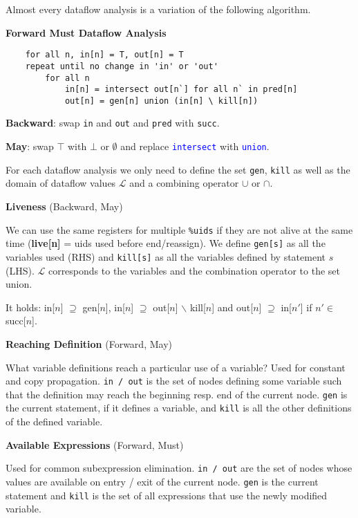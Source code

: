 Almost every dataflow analysis is a variation of the following algorithm.\smallskip

\textbf{Forward Must Dataflow Analysis}
\begin{lstlisting}
	for all n, in[n] = T, out[n] = T
	repeat until no change in 'in' or 'out'
		for all n
			in[n] = intersect out[n`] for all n` in pred[n]
			out[n] = gen[n] union (in[n] \ kill[n])	
\end{lstlisting}
\textbf{Backward}: swap \texttt{in} and \texttt{out} and \texttt{pred} with \texttt{succ}.

\textbf{May}: swap $\top$ with $\bot$ or $\emptyset$ and replace \textcolor{blue}{\texttt{intersect}} with \textcolor{blue}{\texttt{union}}.\medskip

For each dataflow analysis we only need to define the set \texttt{gen}, \texttt{kill} as well as the domain of dataflow values $\mathcal L$ and a combining operator $\cup$ or $\cap$.\medskip

\textbf{Liveness} (Backward, May)\medskip

We can use the same registers for multiple \texttt{\%uids} if they are not alive at the same time
(\textbf{live[n]} = uids used before end/reassign).
We define \texttt{gen[s]} as all the variables used (RHS) and \texttt{kill[s]} as all the variables defined by statement $s$ (LHS). $\mathcal L$ corresponds to the variables and the combination operator to the set union.\medskip

It holds: in[$n$] $\supseteq$ gen[$n$], in[$n$] $\supseteq$ out[$n$] $\backslash$ kill[$n$] and out[$n$] $\supseteq$ in[$n'$] if $n' \in $ succ[$n$].\medskip

\textbf{Reaching Definition} (Forward, May)\medskip

What variable definitions reach a particular use of a variable? Used for constant and copy propagation. \texttt{in / out} is the set of nodes defining some variable such that the definition may reach the beginning resp. end of the current node. \texttt{gen} is the current statement, if it defines a variable, and \texttt{kill} is all the other definitions of the defined variable. \medskip

\textbf{Available Expressions} (Forward, Must)\medskip

Used for common subexpression elimination. \texttt{in / out} are the set of nodes whose values are available on entry / exit of the current node. \texttt{gen} is the current statement and \texttt{kill} is the set of all expressions that use the newly modified variable.\medskip

